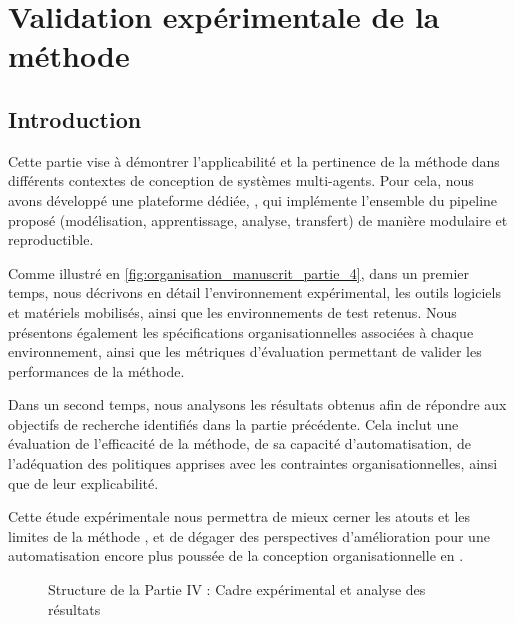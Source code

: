 \cleardoublepage
{}
\part{Validation expérimentale de la méthode}

\chapter*{Introduction}
\label{part:experimentation}


\noindent
Cette partie vise à démontrer l'applicabilité et la pertinence de la méthode  dans différents contextes de conception de systèmes multi-agents. Pour cela, nous avons développé une plateforme dédiée, , qui implémente l'ensemble du pipeline proposé (modélisation, apprentissage, analyse, transfert) de manière modulaire et reproductible.

\medskip

\noindent
Comme illustré en \autoref{fig:organisation_manuscrit_partie_4}, dans un premier temps, nous décrivons en détail l'environnement expérimental, les outils logiciels et matériels mobilisés, ainsi que les environnements de test retenus. Nous présentons également les spécifications organisationnelles associées à chaque environnement, ainsi que les métriques d'évaluation permettant de valider les performances de la méthode.

\medskip

\noindent
Dans un second temps, nous analysons les résultats obtenus afin de répondre aux objectifs de recherche identifiés dans la partie précédente. Cela inclut une évaluation de l'efficacité de la méthode, de sa capacité d'automatisation, de l'adéquation des politiques apprises avec les contraintes organisationnelles, ainsi que de leur explicabilité.

\medskip

\noindent
Cette étude expérimentale nous permettra de mieux cerner les atouts et les limites de la méthode , et de dégager des perspectives d'amélioration pour une automatisation encore plus poussée de la conception organisationnelle en .



\begin{figure}[h!]
    \centering
    \resizebox{\linewidth}{!}{%
        
    }
    \caption{Structure de la Partie IV : Cadre expérimental et analyse des résultats}
    \label{fig:organisation_manuscrit_partie_4}
\end{figure}

